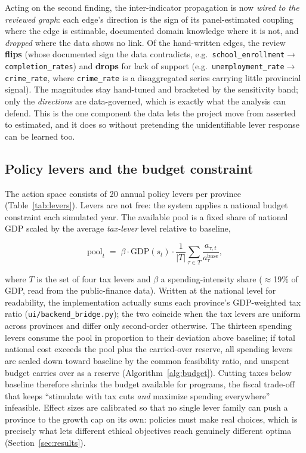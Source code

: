 \documentclass[11pt,a4paper]{article}
\newcommand{\code}[1]{\texttt{#1}}
\begin{document}
Acting on the second finding, the inter-indicator propagation is now
\emph{wired to the reviewed graph}: each edge's direction is the sign of its
panel-estimated coupling where the edge is estimable, documented domain
knowledge where it is not, and \emph{dropped} where the data shows no link. Of
the \strEdgesTotal{} hand-written edges, the review \textbf{flips
\strEdgesFlipped{}} (whose documented sign the data contradicts, e.g.\
\code{school\_enrollment}$\to$\code{completion\_rates}) and \textbf{drops
\strEdgesDropped{}} for lack of support (e.g.\
\code{unemployment\_rate}$\to$\code{crime\_rate}, where \code{crime\_rate} is a
disaggregated series carrying little provincial signal). The magnitudes stay
hand-tuned and bracketed by the sensitivity band; only the \emph{directions} are
data-governed, which is exactly what the analysis can defend. This is the one
component the data lets the project move from asserted to estimated, and it does
so without pretending the unidentifiable lever response can be learned too.

\subsection{Policy levers and the budget constraint}
\label{sec:budget}

The action space consists of 20 annual policy levers per province
(Table~\ref{tab:levers}). Levers are not free: the system applies a national
budget constraint each simulated year. The available pool is a fixed share of
national GDP scaled by the average \emph{tax-lever} level relative to baseline,

\begin{equation}
    \text{pool}_t \;=\; \beta \cdot \mathrm{GDP}(s_t) \cdot
    \frac{1}{|T|} \sum_{\tau \in T} \frac{a_{\tau,t}}{a^{\text{base}}_{\tau}},
\end{equation}

where $T$ is the set of four tax levers and $\beta$ a spending-intensity share
($\approx$19\% of GDP, read from the public-finance data). Written at the
national level for readability, the implementation actually sums each
province's GDP-weighted tax ratio (\code{ui/backend\_bridge.py}); the two
coincide when the tax levers are uniform across provinces and differ only
second-order otherwise.
The thirteen spending levers consume the pool in proportion to their deviation
above baseline; if total national cost exceeds the pool plus the carried-over
reserve, all spending levers are scaled down toward baseline by the common
feasibility ratio, and unspent budget carries over as a reserve
(Algorithm~\ref{alg:budget}). Cutting taxes below baseline therefore shrinks
the budget available for programs, the fiscal trade-off that keeps
``stimulate with tax cuts \emph{and} maximize spending everywhere''
infeasible. Effect sizes are calibrated so that no single lever family can push
a province to the growth cap on its own: policies must make real choices, which
is precisely what lets different ethical objectives reach genuinely different
optima (Section~\ref{sec:results}).
\end{document}
